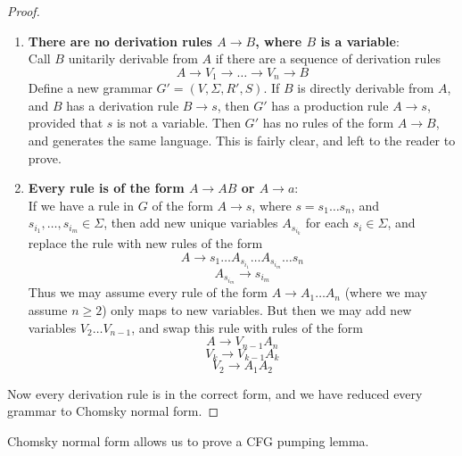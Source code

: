 \begin{proof}
\begin{enumerate}
        \item {\bf There are no derivation rules $A \rightarrow B$, where $B$ is a variable}:\\
        Call $B$ unitarily derivable from $A$ if there are a sequence of derivation rules
        \[ A \rightarrow V_1 \rightarrow \dots \rightarrow V_n \rightarrow B \]
        Define a new grammar $G' = (V,\Sigma,R',S)$. If $B$ is directly derivable from $A$, and $B$ has a derivation rule $B \rightarrow s$, then $G'$ has a production rule $A \rightarrow s$, provided that $s$ is not a variable. Then $G'$ has no rules of the form $A \rightarrow B$, and generates the same language. This is fairly clear, and left to the reader to prove.

        \item {\bf Every rule is of the form $A \rightarrow AB$ or $A \rightarrow a$}:\\
        If we have a rule in $G$ of the form $A \rightarrow s$, where $s = s_1 \dots s_n$, and $s_{i_1}, \dots, s_{i_m} \in \Sigma$, then add new unique variables $A_{s_{i_k}}$ for each $s_i \in \Sigma$, and replace the rule with new rules of the form
        \[ A \rightarrow s_1 \dots A_{s_{i_1}} \dots A_{s_{i_m}} \dots s_n \]
        \[ A_{s_{i_m}} \rightarrow s_{i_m} \]
        Thus we may assume every rule of the form $A \rightarrow A_1 \dots A_n$ (where we may assume $n \geq 2$) only maps to new variables. But then we may add new variables $V_2 \dots V_{n-1}$, and swap this rule with rules of the form
        \[ A \rightarrow V_{n-1} A_n \]
        \[ V_k \rightarrow V_{k-1} A_k \]
        \[ V_2 \rightarrow A_1 A_2 \]
    \end{enumerate}
    Now every derivation rule is in the correct form, and we have reduced every grammar to Chomsky normal form.
\end{proof}

Chomsky normal form allows us to prove a CFG pumping lemma.

